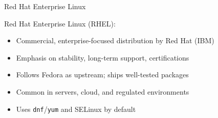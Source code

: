 \documentclass{beamer}
\begin{document}
\begin{frame}{Red Hat Enterprise Linux}
  \begin{minipage}[t]{0.65\textwidth}
    Red Hat Enterprise Linux (RHEL):
    \begin{itemize}
      \item Commercial, enterprise-focused distribution by Red Hat (IBM)
      \item Emphasis on stability, long-term support, certifications
      \item Follows Fedora as upstream; ships well-tested packages
      \item Common in servers, cloud, and regulated environments
      \item Uses \texttt{dnf}/\texttt{yum} and SELinux by default
    \end{itemize}
  \end{minipage}
  \hfill
  \begin{minipage}[t]{0.3\textwidth}
    \centering
    \\[6pt]
  \end{minipage}
\end{frame}
\end{document}
